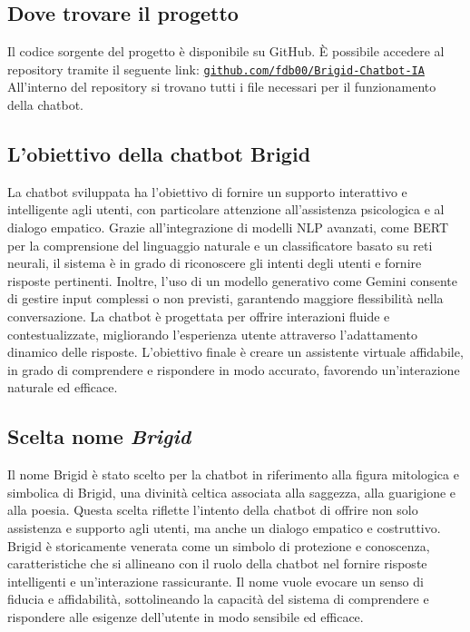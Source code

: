 \documentclass[12pt, letterpaper]{article}
\begin{document}
\subsection{Dove trovare il progetto}
Il codice sorgente del progetto è disponibile su GitHub. È possibile accedere al repository tramite il seguente link:  
\noindent\href{https://github.com/fdb00/Brigid-Chatbot-IA.git}{\texttt{github.com/fdb00/Brigid-Chatbot-IA}}\\
All'interno del repository si trovano tutti i file necessari per il funzionamento della chatbot.

\subsection{L'obiettivo della chatbot Brigid}
La chatbot sviluppata ha l’obiettivo di fornire un supporto interattivo e intelligente agli utenti, con particolare attenzione all'assistenza psicologica e al dialogo empatico. Grazie all’integrazione di modelli NLP avanzati, come BERT per la comprensione del linguaggio naturale e un classificatore basato su reti neurali, il sistema è in grado di riconoscere gli intenti degli utenti e fornire risposte pertinenti. Inoltre, l’uso di un modello generativo come Gemini consente di gestire input complessi o non previsti, garantendo maggiore flessibilità nella conversazione. La chatbot è progettata per offrire interazioni fluide e contestualizzate, migliorando l’esperienza utente attraverso l’adattamento dinamico delle risposte. L’obiettivo finale è creare un assistente virtuale affidabile, in grado di comprendere e rispondere in modo accurato, favorendo un’interazione naturale ed efficace.

\subsection{Scelta nome \textit{Brigid}}
Il nome Brigid è stato scelto per la chatbot in riferimento alla figura mitologica e simbolica di Brigid, una divinità celtica associata alla saggezza, alla guarigione e alla poesia. Questa scelta riflette l’intento della chatbot di offrire non solo assistenza e supporto agli utenti, ma anche un dialogo empatico e costruttivo. Brigid è storicamente venerata come un simbolo di protezione e conoscenza, caratteristiche che si allineano con il ruolo della chatbot nel fornire risposte intelligenti e un’interazione rassicurante. Il nome vuole evocare un senso di fiducia e affidabilità, sottolineando la capacità del sistema di comprendere e rispondere alle esigenze dell’utente in modo sensibile ed efficace.
\end{document}
